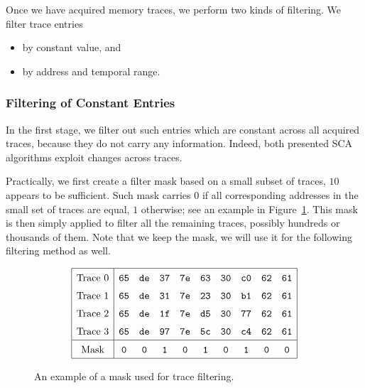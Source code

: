 Once we have acquired memory traces, we perform two kinds of filtering. We filter trace entries
\begin{itemize}
	\item by constant value, and
	\item by address and temporal range.
\end{itemize}

\subsubsection{Filtering of Constant Entries}
	
	In the first stage, we filter out such entries which are constant across all acquired traces, because they do not carry any information. Indeed, both presented SCA algorithms exploit changes across traces.
	
	Practically, we first create a filter mask based on a small subset of traces, $10$ appears to be sufficient. Such mask carries $0$ if all corresponding addresses in the small set of traces are equal, $1$ otherwise; see an example in Figure~\ref{fig:constmask}. This mask is then simply applied to filter all the remaining traces, possibly hundreds or thousands of them. Note that we keep the mask, we will use it for the following filtering method as well.
	
	\begin{figure}[H]
	\[
	\arraycolsep=.5em\def\arraystretch{1.5}
		\begin{array}{|c|ccccccccc|}
			\hline
			\textnormal{Trace 0} & {\tt 65} & {\tt de} & {\tt 37} & {\tt 7e} & {\tt 63} & {\tt 30} & {\tt c0} & {\tt 62} & {\tt 61} \\
			\textnormal{Trace 1} & {\tt 65} & {\tt de} & {\tt 31} & {\tt 7e} & {\tt 23} & {\tt 30} & {\tt b1} & {\tt 62} & {\tt 61} \\
			\textnormal{Trace 2} & {\tt 65} & {\tt de} & {\tt 1f} & {\tt 7e} & {\tt d5} & {\tt 30} & {\tt 77} & {\tt 62} & {\tt 61} \\
			\textnormal{Trace 3} & {\tt 65} & {\tt de} & {\tt 97} & {\tt 7e} & {\tt 5c} & {\tt 30} & {\tt c4} & {\tt 62} & {\tt 61} \\
			\hline
			\textnormal{Mask}    & {\tt 0}  & {\tt 0}  & {\tt 1}  & {\tt 0}  & {\tt 1}  & {\tt 0}  & {\tt 1}  & {\tt 0}  & {\tt 0} \\
			\hline
		\end{array}
	\]
	\caption{An example of a mask used for trace filtering.}
	\label{fig:constmask}
	\end{figure}
	
